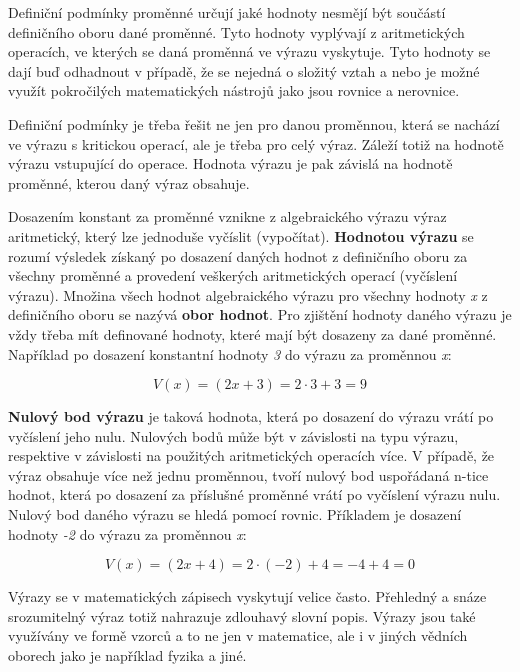 
Definiční podmínky proměnné určují jaké hodnoty nesmějí být součástí definičního oboru dané proměnné. Tyto hodnoty vyplývají z aritmetických operacích, ve kterých se daná proměnná ve výrazu vyskytuje. Tyto hodnoty se dají buď odhadnout v případě, že se nejedná o složitý vztah a nebo je možné využít pokročilých matematických nástrojů jako jsou rovnice a nerovnice. 

Definiční podmínky je třeba řešit ne jen pro danou proměnnou, která se nachází ve výrazu s kritickou operací, ale je třeba pro celý výraz. Záleží totiž na hodnotě výrazu vstupující do operace. Hodnota výrazu je pak závislá na hodnotě proměnné, kterou daný výraz obsahuje.



Dosazením konstant za proměnné vznikne z algebraického výrazu výraz aritmetický, který lze jednoduše vyčíslit (vypočítat). {\bf Hodnotou výrazu} se rozumí výsledek získaný po dosazení daných hodnot z definičního oboru za všechny proměnné a provedení veškerých aritmetických operací (vyčíslení výrazu). Množina všech hodnot algebraického výrazu pro všechny hodnoty {\it x} z definičního oboru se nazývá {\bf obor hodnot}. Pro zjištění hodnoty daného výrazu je vždy třeba mít definované hodnoty, které mají být dosazeny za dané proměnné. Například po dosazení konstantní hodnoty {\it 3} do výrazu za proměnnou {\it x}:

$$ V(x) = (2x + 3) = 2\cdot 3 + 3 = 9 $$

{\bf Nulový bod výrazu} je taková hodnota, která po dosazení do výrazu vrátí po vyčíslení jeho nulu. Nulových bodů může být v závislosti na typu výrazu, respektive v závislosti na použitých aritmetických operacích více. V případě, že výraz obsahuje více než jednu proměnnou, tvoří nulový bod uspořádaná n-tice hodnot, která po dosazení za příslušné proměnné vrátí po vyčíslení výrazu nulu. Nulový bod daného výrazu se hledá pomocí rovnic. Příkladem je dosazení hodnoty {\it -2} do výrazu za proměnnou {\it x}:

$$ V(x) = (2x + 4) = 2 \cdot (-2) +4 = -4 +4 = 0 $$

Výrazy se v matematických zápisech vyskytují velice často. Přehledný a snáze srozumitelný výraz totiž nahrazuje zdlouhavý slovní popis. Výrazy jsou také využívány ve formě vzorců a to ne jen v matematice, ale i v jiných vědních oborech jako je například fyzika a jiné.



